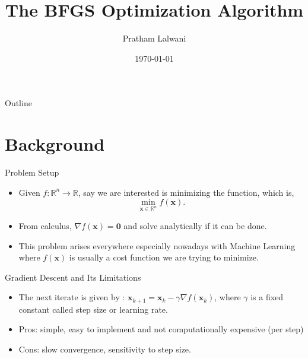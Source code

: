\documentclass{beamer}
\title{The BFGS Optimization Algorithm}
\author{Pratham Lalwani}
\institute{UC Merced}
\date{\today}
\begin{document}
\frame{\titlepage}

\begin{frame}{Outline}
	\tableofcontents
\end{frame}

\section{Background}
\begin{frame}{Problem Setup}
	\begin{itemize}
		\item Given $f:\mathbb{R}^n \to \mathbb{R}$, say we are interested is minimizing the function, which is,
		      \[
			      \min_{\bm x\in \mathbb{R}^n} f(\bm x)
			      .\]
		\item From calculus, $\nabla f(\bm x) = \bm 0$ and solve analytically if it can be done.
		\item This problem arises everywhere especially nowadays with Machine Learning where $f(\bm x)$ is usually a cost function we are trying to minimize.
	\end{itemize}
\end{frame}

\begin{frame}{Gradient Descent and Its Limitations}
	\begin{itemize}
		With no way to compute a analytic solution one might turn a simple algorithm like Gradient Descent.
		\item The next iterate is given by : $\bm x_{k+1} = \bm x_k - \gamma \nabla f(\bm x_k)$, where $\gamma$ is a fixed constant called step size or learning rate.
		\item Pros: simple, easy to implement and not computationally expensive (per step)
		\item Cons: slow convergence, sensitivity to step size.
	\end{itemize}
\end{frame}
\end{document}

